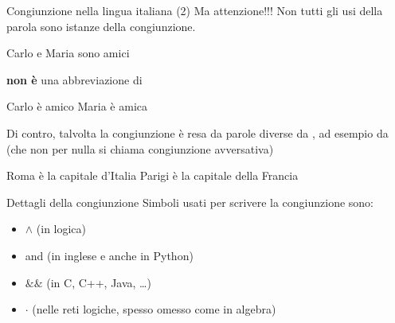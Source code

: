 \documentclass[10pt,dvipsnames]{beamer}
\begin{document}
\begin{frame}{Congiunzione nella lingua italiana (2)}
    Ma attenzione!!! Non tutti gli usi della parola  sono istanze della congiunzione.
    \begin{example}
        Carlo e Maria sono amici\medskip

        \pause
        \hspace{2cm} \textbf{non è} una abbreviazione di\medskip

        Carlo è amico  Maria è amica\medskip
    \end{example}

    \pause
    \medskip
    Di contro, talvolta la congiunzione è resa da parole diverse da , ad esempio da  (che non per nulla si chiama \alert{congiunzione avversativa})

    \begin{example}
        Roma è la capitale d'Italia  Parigi è la capitale della Francia
    \end{example}
\end{frame}

\begin{frame}{Dettagli della congiunzione}
    Simboli usati per scrivere la congiunzione sono:
    \begin{itemize}
        \item \alert{$\wedge$ (in logica)}
        \item and (in inglese e anche in Python)
        \item $\texttt{\&\&}$ (in C, C++, Java, \ldots)
        \item $\cdot$ (nelle reti logiche, spesso omesso come in algebra)
    \end{itemize}

\end{frame}
\end{document}
